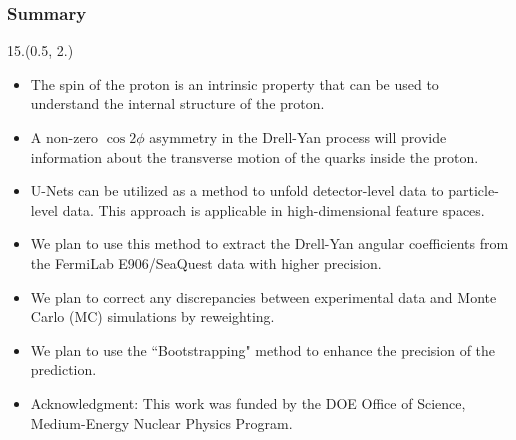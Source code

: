 \documentclass[12pt, xcolor={dvipsnames}, aspectratio = 169, sans, mathserif]{beamer}
\newenvironment{List}[2]
{\begin{textblock}{#1}#2
\begin{itemize}}
{\end{itemize}
\end{textblock}}
\begin{document}
\begin{frame}
\frametitle{Summary}

\begin{List}{15.}{(0.5, 2.)}

  \item The spin of the proton is an intrinsic property that can be used to understand the internal structure of the proton.

  \item A non-zero $\cos2\phi$ asymmetry in the Drell-Yan process will provide information about the transverse motion of the quarks inside the proton.

  \item U-Nets can be utilized as a method to unfold detector-level data to particle-level data. This approach is applicable in high-dimensional feature spaces.

  \item We plan to use this method to extract the Drell-Yan angular coefficients from the FermiLab E906/SeaQuest data with higher  precision.

  \item We plan to correct any discrepancies between experimental data and Monte Carlo (MC) simulations by reweighting.

  \item We plan to use the ``Bootstrapping" method to enhance the precision of the prediction.

  \item Acknowledgment: This work was funded by the DOE Office of Science, Medium-Energy Nuclear Physics Program.

\end{List}

\end{frame}
\end{document}
